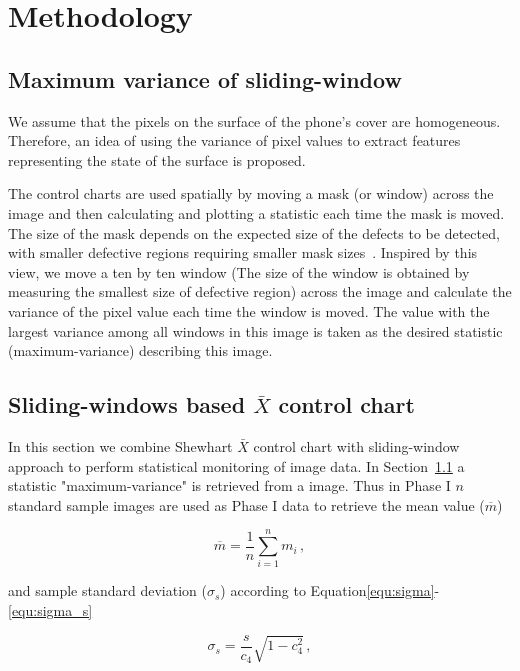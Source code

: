 \chapter{Methodology}
\label{cp:Methodology}



\section{Maximum variance of sliding-window}
\label{sec:maxvar}
We assume that the pixels on the surface of the phone's cover are homogeneous. Therefore, an idea of using the variance of pixel values to extract features representing the state of the surface is proposed.



The control charts are used spatially by moving a mask (or window) across the image and then calculating and plotting a statistic each time the mask is moved. The size of the mask depends on the expected size of the defects to be detected, with smaller defective regions requiring smaller mask sizes~\cite{megahed2011review}. Inspired by this view, we move a ten by ten window (The size of the window is obtained by measuring the smallest size of defective region) across the image and calculate the variance of the pixel value each time the window is moved. The value with the largest variance among all windows in this image is taken as the desired statistic (maximum-variance) describing this image.


\section{Sliding-windows based $\bar{X}$ control chart}
In this section we combine Shewhart $\bar{X}$ control chart with sliding-window approach to perform statistical monitoring of image data. 
In Section~\ref{sec:maxvar} a statistic "maximum-variance" is retrieved from a image. Thus in Phase I $n$ standard sample images are used as Phase I data to retrieve the mean value ($\overline{m}$)

\begin{equation}
\overline{m}=\frac{1}{n} \sum_{i=1}^{n} m_{i}\,,
\label{equ:m_mean}
\end{equation}

and sample standard deviation ($ \sigma_{s} $) according to Equation\eqref{equ:sigma}-\eqref{equ:sigma_s} 

\begin{equation}
    \sigma_{s}=\frac{s}{c_{4}} \sqrt{1-c_{4}^{2}}\,,
    \label{equ:standarg_deviation}
\end{equation}

